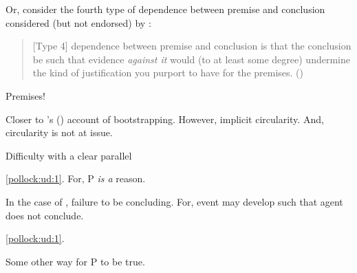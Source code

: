 \begin{note}
{    Or, consider the fourth type of dependence between premise and conclusion considered (but not endorsed) by \textcite{Pryor:2004ws}:

  \begin{quote}
    [Type 4] dependence between premise and conclusion is that the conclusion be such that evidence \emph{against it} would (to at least some degree) undermine the kind of justification you purport to have for the premises.%
    \mbox{}\hfill\mbox{(\citeyear[359]{Pryor:2004ws})}
  \end{quote}
  Premises!

  \nocite{Weisberg:2012vs}
  Closer to \citeauthor{Weisberg:2010to}'s (\citeyear{Weisberg:2010to}) account of bootstrapping.
  However, implicit circularity.
  And, circularity is not at issue.
  }
\end{note}

\begin{note}
  Difficulty with a clear parallel


  \ref{pollock:ud:1}.
  For, P \emph{is a} reason.

  In the case of , failure to be concluding.
  For, event may develop such that agent does not conclude.

  \ref{pollock:ud:1}.

  Some other way for P to be true.
\end{note}

